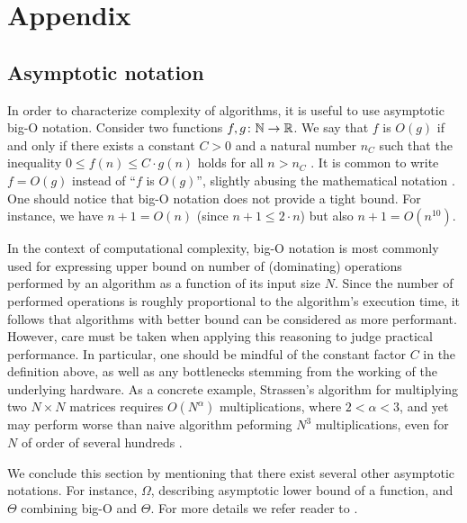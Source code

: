 \chapter*{Appendix}


\section{Asymptotic notation}

In order to characterize complexity of algorithms, it is useful to use asymptotic big-O notation. Consider two functions $f, g \colon \mathbb{N} \to \mathbb{R}$. We say that $f$ is $O(g)$ if and only if there exists a constant $C > 0$ and a natural number $n_{C}$ such that the inequality $0 \le f(n) \le C\cdot g(n)$ holds for all $n > n_{C}$ \cite{clrs}. It is common to write $f=O(g)$ instead of ``$f$ is $O(g)$'', slightly abusing the mathematical notation \cite{clrs}. One should notice that big-O notation does not provide a tight bound. For instance, we have $n + 1 = O(n)$ (since $n + 1 \le 2 \cdot n$) but also $n+1 = O(n^{10})$.

In the context of computational complexity, big-O notation is most commonly used for expressing upper bound on number of (dominating) operations performed by an algorithm as a function of its input size $N$. Since the number of performed operations is roughly proportional to the algorithm's execution time, it follows that algorithms with better bound can be considered as more performant. However, care must be taken when applying this reasoning to judge practical performance. In particular, one should be mindful of the constant factor $C$ in the definition above, as well as any bottlenecks stemming from the working of the underlying hardware. As a concrete example, Strassen's algorithm for multiplying two $N \times N$ matrices requires $O(N^{\alpha})$ multiplications, where $2 < \alpha < 3$, and yet may perform  worse than naive algorithm peforming $N^{3}$ multiplications, even for $N$ of order of several hundreds \cite{dalberto}.

We conclude this section by mentioning that there exist several other asymptotic notations. For instance, $\Omega$, describing asymptotic lower bound of a function, and $\Theta$ combining big-O and $\Theta$. For more details we refer reader to \cite{clrs}.
